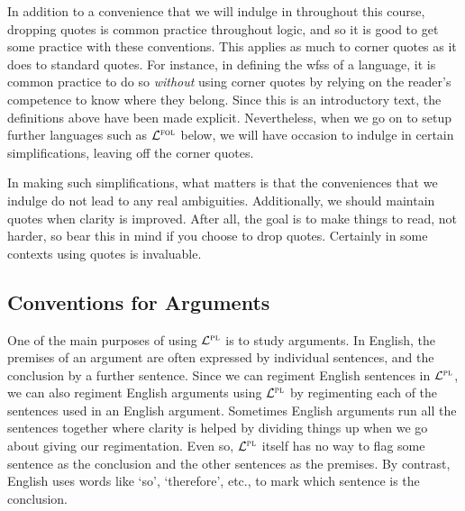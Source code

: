 In addition to a convenience that we will indulge in throughout this course, dropping quotes is common practice throughout logic, and so it is good to get some practice with these conventions.
This applies as much to corner quotes as it does to standard quotes.
For instance, in defining the wfss of a language, it is common practice to do so \textit{without} using corner quotes by relying on the reader's competence to know where they belong.
Since this is an introductory text, the definitions above have been made explicit.
Nevertheless, when we go on to setup further languages such as $\mathcal{L}^{\textsc{fol}}$ below, we will have occasion to indulge in certain simplifications, leaving off the corner quotes.

In making such simplifications, what matters is that the conveniences that we indulge do not lead to any real ambiguities.
Additionally, we should maintain quotes when clarity is improved. 
After all, the goal is to make things to read, not harder, so bear this in mind if you choose to drop quotes.
Certainly in some contexts using quotes is invaluable.




\subsection{Conventions for Arguments}
  \label{sub.QuoteArguments}

One of the main purposes of using $\mathcal{L}^{\textsc{pl}}$ is to study arguments.
In English, the premises of an argument are often expressed by individual sentences, and the conclusion by a further sentence.
Since we can regiment English sentences in $\mathcal{L}^{\textsc{pl}}$, we can also regiment English arguments using $\mathcal{L}^{\textsc{pl}}$ by regimenting each of the sentences used in an English argument.
Sometimes English arguments run all the sentences together where clarity is helped by dividing things up when we go about giving our regimentation.
Even so, $\mathcal{L}^{\textsc{pl}}$ itself has no way to flag some sentence as the conclusion and the other sentences as the premises.
By contrast, English uses words like `so', `therefore', etc., to mark which sentence is the conclusion.

